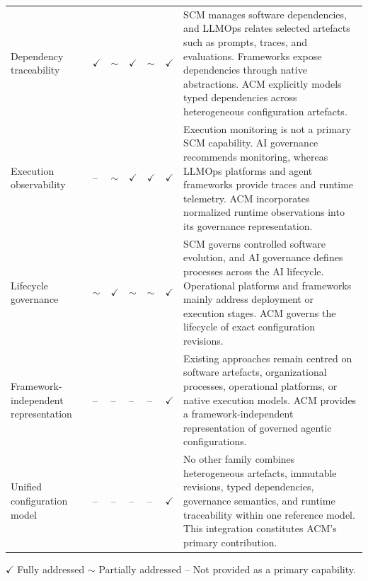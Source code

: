 \documentclass[10pt]{article}
\begin{document}
\begin{table}[t]
\begin{tabularx}{\textwidth}{
			>{\RaggedRight\arraybackslash}p{3.25cm}
			C{1.05cm}
			C{1.15cm}
			C{1.45cm}
			C{1.30cm}
			C{0.85cm}
			Y
		}
		Dependency traceability
		&
		$\checkmark$
		&
		$\sim$
		&
		$\checkmark$
		&
		$\sim$
		&
		$\checkmark$
		&
		SCM manages software dependencies, and LLMOps relates selected
		artefacts such as prompts, traces, and evaluations.
		Frameworks expose dependencies through native abstractions.
		ACM explicitly models typed dependencies across heterogeneous
		configuration artefacts.
		\\
		
		Execution observability
		&
		--
		&
		$\sim$
		&
		$\checkmark$
		&
		$\checkmark$
		&
		$\checkmark$
		&
		Execution monitoring is not a primary SCM capability.
		AI governance recommends monitoring, whereas LLMOps platforms and
		agent frameworks provide traces and runtime telemetry.
		ACM incorporates normalized runtime observations into its governance
		representation.
		\\
		
		Lifecycle governance
		&
		$\sim$
		&
		$\checkmark$
		&
		$\sim$
		&
		$\sim$
		&
		$\checkmark$
		&
		SCM governs controlled software evolution, and AI governance defines
		processes across the AI lifecycle.
		Operational platforms and frameworks mainly address deployment or
		execution stages.
		ACM governs the lifecycle of exact configuration revisions.
		\\
		
		Framework-independent representation
		&
		--
		&
		--
		&
		--
		&
		--
		&
		$\checkmark$
		&
		Existing approaches remain centred on software artefacts,
		organizational processes, operational platforms, or native execution
		models.
		ACM provides a framework-independent representation of governed
		agentic configurations.
		\\
		
		Unified configuration model
		&
		--
		&
		--
		&
		--
		&
		--
		&
		$\checkmark$
		&
		No other family combines heterogeneous artefacts, immutable
		revisions, typed dependencies, governance semantics, and runtime
		traceability within one reference model.
		This integration constitutes ACM's primary contribution.
		\\
		
		\bottomrule
	\end{tabularx}
	
	\vspace{0.4em}
	
	{\scriptsize
		$\checkmark$ Fully addressed
		\hspace{1em}
		$\sim$ Partially addressed
		\hspace{1em}
		-- Not provided as a primary capability.
	}
	
\end{table}
	
\end{document}
